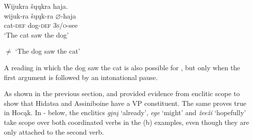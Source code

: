 \documentclass[output=paper]{LSP/langsci}
\begin{document}
\begin{exe}
\ex 
\glll Wijukra	\v{s}\k{u}\k{u}kra 		haja.\\
wijuk-ra 		\v{s}\k{u}\k{u}k-ra 		$\varnothing$-haja \\
cat-\textsc{def} 		dog-\textsc{def} 	\textsc{3s/o}-see \\
\trans `The cat saw the dog'

$\neq$ `The dog saw the cat'
\end{exe}

A reading in which the dog saw the cat is also possible for , but only when the first argument is followed by an intonational pause.
	
As shown in the previous section, \citet{Boyle2007} and \citet{West2003} provided evidence from enclitic scope to show that Hidatsa and Assiniboine have a VP constituent.  The same proves true in Hocąk.  In - below, the enclitics \textit{g\k{i}n\k{i}} `already', \textit{ege} `might' and \textit{\v{z}ee\v{z}i} `hopefully' take scope over both coordinated verbs in the (b) examples, even though they are only attached to the second verb.
\end{document}
